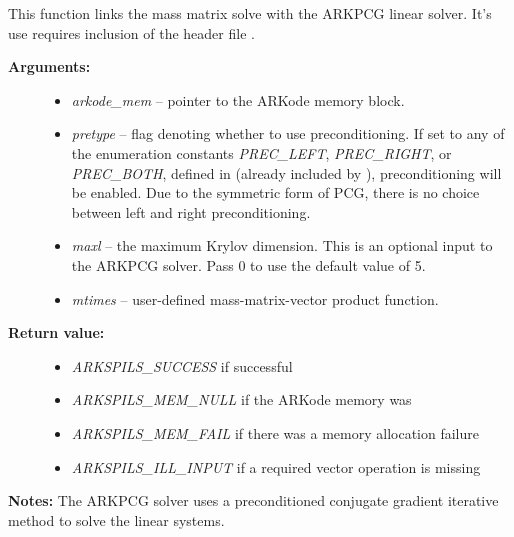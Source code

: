 \documentclass[letterpaper,10pt,english]{sphinxmanual}
\begin{document}

\begin{fulllineitems}
\label{c_interface/User_callable:ARKMassPcg}
This function links the mass matrix solve with the ARKPCG linear
solver.  It's use requires inclusion of the header file
.
\begin{description}
\item[{\textbf{Arguments:}}] \leavevmode\begin{itemize}
\item {} 
\emph{arkode\_mem} -- pointer to the ARKode memory block.

\item {} 
\emph{pretype} -- flag denoting whether to use preconditioning.  If
set to any of the enumeration constants \emph{PREC\_LEFT}, \emph{PREC\_RIGHT},
or \emph{PREC\_BOTH}, defined in  (already
included by ), preconditioning will be
enabled. Due to the symmetric form of PCG, there is no choice
between left and right preconditioning.

\item {} 
\emph{maxl} -- the maximum Krylov dimension. This is an optional input
to the ARKPCG solver. Pass 0 to use the default value of 5.

\item {} 
\emph{mtimes} -- user-defined mass-matrix-vector product function.

\end{itemize}

\item[{\textbf{Return value:}}] \leavevmode\begin{itemize}
\item {} 
\emph{ARKSPILS\_SUCCESS} if successful

\item {} 
\emph{ARKSPILS\_MEM\_NULL}  if the ARKode memory was 

\item {} 
\emph{ARKSPILS\_MEM\_FAIL}  if there was a memory allocation failure

\item {} 
\emph{ARKSPILS\_ILL\_INPUT} if a required vector operation is missing

\end{itemize}

\end{description}

\textbf{Notes:} The ARKPCG solver uses a preconditioned conjugate
gradient iterative method to solve the linear systems.

\end{fulllineitems}
\end{document}
